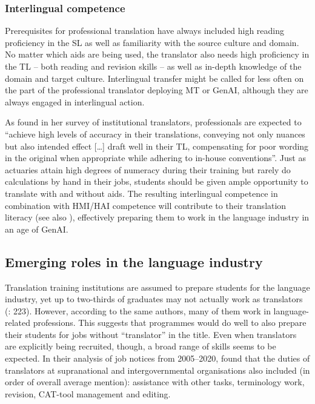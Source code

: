 \documentclass[output=paper]{langscibook}
\begin{document}
\subsubsection{Interlingual competence} %

Prerequisites for professional translation have always included high reading proficiency in the SL as well as familiarity with the source culture and domain. No matter which aids are being used, the translator also needs high proficiency in the TL – both reading and revision skills – as well as in-depth knowledge of the domain and target culture. Interlingual transfer might be called for less often on the part of the professional translator deploying MT or GenAI, although they are always engaged in interlingual action. 

As \citet[43]{lafeber_skills_2023} found in her survey of institutional translators, professionals are expected to “achieve high levels of accuracy in their translations, conveying not only nuances but also intended effect […] draft well in their TL, compensating for poor wording in the original when appropriate while adhering to in-house conventions”. Just as actuaries attain high degrees of numeracy during their training but rarely do calculations by hand in their jobs, students should be given ample opportunity to translate with and without aids. The resulting interlingual competence in combination with HMI/HAI competence will contribute to their translation literacy (see also \citealt{massey_translation_2021}), effectively preparing them to work in the language industry in an age of GenAI.

\subsection{Emerging roles in the language industry}

Translation training institutions are assumed to prepare students for the language industry, yet up to two-thirds of graduates may not actually work as translators (\citealt{hao_where_2023}: 223). However, according to the same authors, many of them work in language-related professions. This suggests that programmes would do well to also prepare their students for jobs without “translator” in the title. Even when translators are explicitly being recruited, though, a broad range of skills seems to be expected. In their analysis of job notices from 2005--2020, \citet[53--55]{prieto_ramos_institutional_2023} found that the duties of translators at supranational and intergovernmental organisations also included (in order of overall average mention): assistance with other tasks, terminology work, revision, CAT-tool management and editing.
\end{document}
